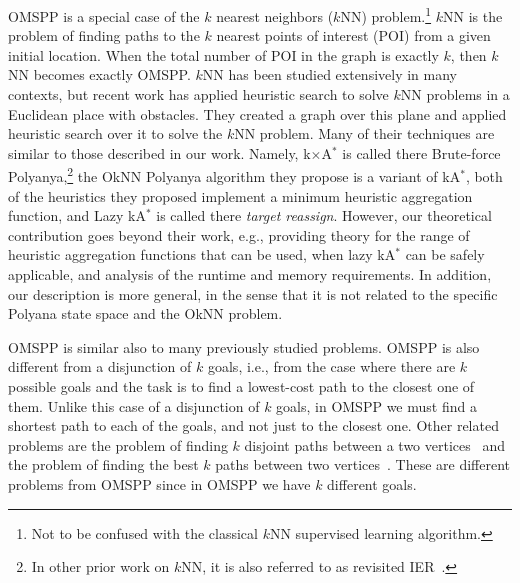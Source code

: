 \documentclass[smallextended]{svjour3}       %
\newcommand{\omspp}{\ac{OMSPP}\xspace}
\newcommand{\kastar}{kA$^*$\xspace}
\newcommand{\kxastar}{k$\times$A$^*$\xspace}
\begin{document}
\omspp is a special case of the $k$ nearest neighbors ($k$NN) problem.\footnote{Not to be confused with the classical $k$NN supervised learning algorithm.} $k$NN is the problem of finding paths to the $k$ nearest points of interest (POI) from a given initial location.  
When the total number of POI in the graph is exactly $k$, then $k$NN becomes exactly \omspp. 
$k$NN has been studied extensively in many contexts, but recent work has applied heuristic search to solve $k$NN problems in  a Euclidean place with obstacles. They created a graph over this plane and applied heuristic search over it to solve the $k$NN problem. Many of their techniques are similar to those described in our work. Namely, \kxastar is called there Brute-force Polyanya,\footnote{In other prior work on $k$NN, it is also referred to as revisited IER~\cite{abeywickrama2016k}.} the OkNN Polyanya algorithm they propose is a variant of \kastar, both of the heuristics they proposed implement a minimum heuristic aggregation function, and Lazy \kastar is called there \emph{target reassign}. 
However, our theoretical contribution goes beyond their work, e.g., providing theory for the range of heuristic aggregation functions that can be used, when lazy \kastar can be safely applicable, and analysis of the runtime and memory requirements. In addition, our description is more general, in the sense that it is not related to the specific Polyana state space and the OkNN problem. 


\omspp is similar also to many previously studied problems. 
\omspp is also different from a disjunction of $k$ goals, i.e., from the case where there are $k$ possible goals and the task is to find a lowest-cost path to the closest one of them. 
Unlike this case of a disjunction of $k$ goals, in \omspp we must find a shortest path to each of the goals, and not just to the closest one.
Other related problems are the problem of finding $k$ disjoint paths between a two vertices~\cite{suurballe.jw:disjoint} and the problem of finding the best $k$ paths between two vertices~\cite{pollack.m:letter,Eppstein1998}.
These are different problems from \omspp since in \omspp we have $k$ different goals.
\end{document}
